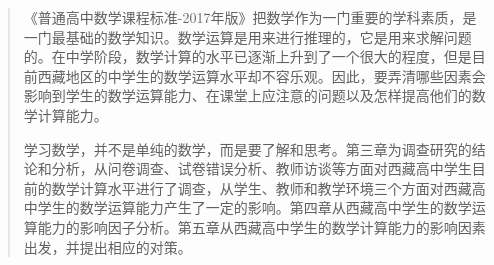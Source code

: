 \documentclass{CCNUthesis}
\begin{document}



\frontmatter


\tableofcontents


\begin{abstract}
  《普通高中数学课程标准-2017年版》把数学作为一门重要的学科素质，是一门最基础的数学知识。数学运算是用来进行推理的，它是用来求解问题的。在中学阶段，数学计算的水平已逐渐上升到了一个很大的程度，但是目前西藏地区的中学生的数学运算水平却不容乐观。因此，要弄清哪些因素会影响到学生的数学运算能力、在课堂上应注意的问题以及怎样提高他们的数学计算能力。

  学习数学，并不是单纯的数学，而是要了解和思考。第三章为调查研究的结论和分析，从问卷调查、试卷错误分析、教师访谈等方面对西藏高中学生目前的数学计算水平进行了调查，从学生、教师和教学环境三个方面对西藏高中学生的数学运算能力产生了一定的影响。第四章从西藏高中学生的数学运算能力的影响因子分析。第五章从西藏高中学生的数学计算能力的影响因素出发，并提出相应的对策。
\end{abstract}
\end{document}
